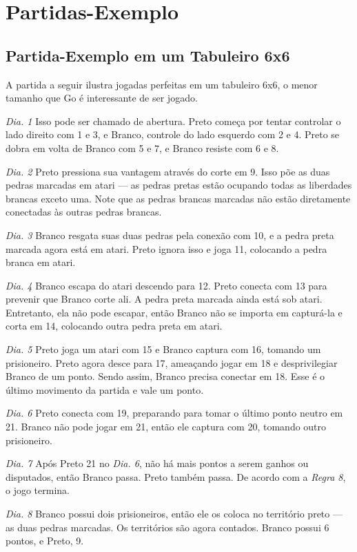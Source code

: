 \chapter{Partidas-Exemplo}\label{chap:cinco}

\section{Partida-Exemplo em um Tabuleiro 6x6}

A partida a seguir ilustra jogadas perfeitas em um tabuleiro 6x6, o menor tamanho que Go é interessante de ser jogado.

\emph{Dia. 1} Isso pode ser chamado de abertura. Preto começa por tentar controlar o lado direito com 1 e 3, e Branco, controle do lado esquerdo com 2 e 4. Preto se dobra em volta de Branco com 5 e 7, e Branco resiste com 6 e 8.

\emph{Dia. 2} Preto pressiona sua vantagem através do corte em 9. Isso põe as duas pedras marcadas em atari --- as pedras pretas estão ocupando todas as liberdades brancas exceto uma. Note que as pedras brancas marcadas não estão diretamente conectadas às outras pedras brancas.

\emph{Dia. 3} Branco resgata suas duas pedras pela conexão com 10, e a pedra preta marcada agora está em atari. Preto ignora isso e joga 11, colocando a pedra branca em atari.

\emph{Dia. 4} Branco escapa do atari descendo para 12. Preto conecta com 13 para prevenir que Branco corte ali. A pedra preta marcada ainda está sob atari. Entretanto, ela não pode escapar, então Branco não se importa em capturá-la e corta em 14, colocando outra pedra preta em atari.

\emph{Dia. 5} Preto joga um atari com 15 e Branco captura com 16, tomando um prisioneiro. Preto agora desce para 17, ameaçando jogar em 18 e desprivilegiar Branco de um ponto. Sendo assim, Branco precisa conectar em 18. Esse é o último movimento da partida e vale um ponto.

\emph{Dia. 6} Preto conecta com 19, preparando para tomar o último ponto neutro em 21. Branco não pode jogar em 21, então ele captura com 20, tomando outro prisioneiro.

\emph{Dia. 7} Após Preto 21 no \emph{Dia. 6}, não há mais pontos a serem ganhos ou disputados, então Branco passa. Preto também passa. De acordo com a \emph{Regra 8}, o jogo termina.

\emph{Dia. 8} Branco possui dois prisioneiros, então ele os coloca no território preto --- as duas pedras marcadas. Os territórios são agora contados. Branco possui 6 pontos, e Preto, 9.

